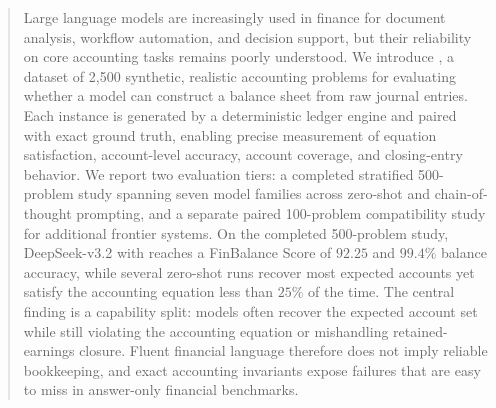 \begin{abstract}
  Large language models are increasingly used in finance for document
  analysis, workflow automation, and decision support, but their
  reliability on core accounting tasks remains poorly understood.
  We introduce \benchmark{}, a dataset of 2{,}500 synthetic, realistic accounting
  problems for evaluating whether a model can construct a balance sheet
  from raw journal entries.
  Each instance is generated by a deterministic ledger engine and paired
  with exact ground truth, enabling precise measurement of equation
  satisfaction, account-level accuracy, account coverage, and
  closing-entry behavior.
  We report two evaluation tiers: a completed stratified 500-problem
  study spanning seven model families across zero-shot and
  chain-of-thought prompting, and a separate paired 100-problem
  compatibility study for additional frontier systems.
  On the completed 500-problem study, DeepSeek-v3.2 with \CoT{} reaches a
  FinBalance Score of \(92.25\) and \(99.4\%\) balance accuracy, while
  several zero-shot runs recover most expected accounts yet satisfy the
  accounting equation less than \(25\%\) of the time.
  The central finding is a capability split: models often recover the
  expected account set while still violating the accounting equation or
  mishandling retained-earnings closure.
  Fluent financial language therefore does not imply reliable
  bookkeeping, and exact accounting invariants expose failures that are
  easy to miss in answer-only financial benchmarks.
\end{abstract}
